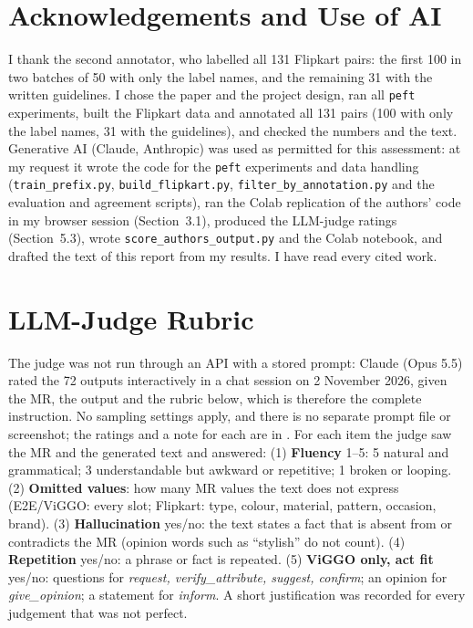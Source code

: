 \documentclass[11pt]{article}
\begin{document}
\section*{Acknowledgements and Use of AI}
{\sloppy I thank the second annotator, who labelled all 131 Flipkart pairs: the first 100 in two batches of 50 with only the label names, and the remaining 31 with the written guidelines. I chose the paper and the project design, ran all \texttt{peft} experiments, built the Flipkart data and annotated all 131 pairs (100 with only the label names, 31 with the guidelines), and checked the numbers and the text. Generative AI (Claude, Anthropic) was used as permitted for this assessment: at my request it wrote the code for the \texttt{peft} experiments and data handling (\texttt{train\_prefix.py}, \texttt{build\_flipkart.py}, \texttt{filter\_by\_annotation.py} and the evaluation and agreement scripts), ran the Colab replication of the authors' code in my browser session (Section~3.1), produced the LLM-judge ratings (Section~5.3), wrote \texttt{score\_authors\_output.py} and the Colab notebook, and drafted the text of this report from my results. I have read every cited work.\par}



\appendix

\section{LLM-Judge Rubric}
\label{app:judge}
\small
The judge was not run through an API with a stored prompt: Claude (Opus 5.5) rated the 72 outputs interactively in a chat session on 2 November 2026, given the MR, the output and the rubric below, which is therefore the complete instruction. No sampling settings apply, and there is no separate prompt file or screenshot; the ratings and a note for each are in .
For each item the judge saw the MR and the generated text and answered: (1) \textbf{Fluency} 1--5: 5 natural and grammatical; 3 understandable but awkward or repetitive; 1 broken or looping. (2) \textbf{Omitted values}: how many MR values the text does not express (E2E/ViGGO: every slot; Flipkart: type, colour, material, pattern, occasion, brand). (3) \textbf{Hallucination} yes/no: the text states a fact that is absent from or contradicts the MR (opinion words such as ``stylish'' do not count). (4) \textbf{Repetition} yes/no: a phrase or fact is repeated. (5) \textbf{ViGGO only, act fit} yes/no: questions for \textit{request, verify\_attribute, suggest, confirm}; an opinion for \textit{give\_opinion}; a statement for \textit{inform}. A short justification was recorded for every judgement that was not perfect.
\end{document}
